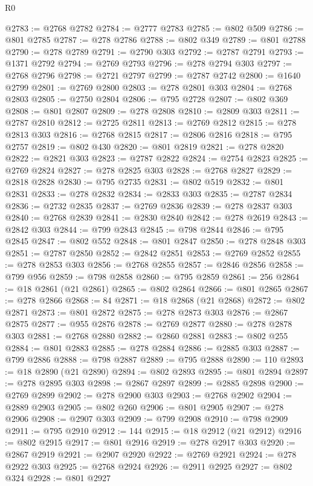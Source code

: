 \begin{lexlean}{R0}
\begin{coremodule}
@2783 := @2768 @2782
@2784 := @2777 @2783
@2785 := @802 @509
@2786 := @801 @2785
@2787 := @278 @2786
@2788 := @802 @349
@2789 := @801 @2788
@2790 := @278 @2789
@2791 := @2790 @303
@2792 := @2787 @2791
@2793 := @1371 @2792
@2794 := @2769 @2793
@2796 := @278 @2794 @303
@2797 := @2768 @2796
@2798 := @2721 @2797
@2799 := @2787 @2742
@2800 := @1640 @2799
@2801 := @2769 @2800
@2803 := @278 @2801 @303
@2804 := @2768 @2803
@2805 := @2750 @2804
@2806 := @795 @2728
@2807 := @802 @369
@2808 := @801 @2807
@2809 := @278 @2808
@2810 := @2809 @303
@2811 := @2787 @2810
@2812 := @2725 @2811
@2813 := @2769 @2812
@2815 := @278 @2813 @303
@2816 := @2768 @2815
@2817 := @2806 @2816
@2818 := @795 @2757
@2819 := @802 @430
@2820 := @801 @2819
@2821 := @278 @2820
@2822 := @2821 @303
@2823 := @2787 @2822
@2824 := @2754 @2823
@2825 := @2769 @2824
@2827 := @278 @2825 @303
@2828 := @2768 @2827
@2829 := @2818 @2828
@2830 := @795 @2735
@2831 := @802 @519
@2832 := @801 @2831
@2833 := @278 @2832
@2834 := @2833 @303
@2835 := @2787 @2834
@2836 := @2732 @2835
@2837 := @2769 @2836
@2839 := @278 @2837 @303
@2840 := @2768 @2839
@2841 := @2830 @2840
@2842 := @278 @2619
@2843 := @2842 @303
@2844 := @799 @2843
@2845 := @798 @2844
@2846 := @795 @2845
@2847 := @802 @552
@2848 := @801 @2847
@2850 := @278 @2848 @303
@2851 := @2787 @2850
@2852 := @2842 @2851
@2853 := @2769 @2852
@2855 := @278 @2853 @303
@2856 := @2768 @2855
@2857 := @2846 @2856
@2858 := @799 @956
@2859 := @798 @2858
@2860 := @795 @2859
@2861 := 256
@2864 := @18 @2861 (@21 @2861)
@2865 := @802 @2864
@2866 := @801 @2865
@2867 := @278 @2866
@2868 := 84
@2871 := @18 @2868 (@21 @2868)
@2872 := @802 @2871
@2873 := @801 @2872
@2875 := @278 @2873 @303
@2876 := @2867 @2875
@2877 := @955 @2876
@2878 := @2769 @2877
@2880 := @278 @2878 @303
@2881 := @2768 @2880
@2882 := @2860 @2881
@2883 := @802 @255
@2884 := @801 @2883
@2885 := @278 @2884
@2886 := @2885 @303
@2887 := @799 @2886
@2888 := @798 @2887
@2889 := @795 @2888
@2890 := 110
@2893 := @18 @2890 (@21 @2890)
@2894 := @802 @2893
@2895 := @801 @2894
@2897 := @278 @2895 @303
@2898 := @2867 @2897
@2899 := @2885 @2898
@2900 := @2769 @2899
@2902 := @278 @2900 @303
@2903 := @2768 @2902
@2904 := @2889 @2903
@2905 := @802 @260
@2906 := @801 @2905
@2907 := @278 @2906
@2908 := @2907 @303
@2909 := @799 @2908
@2910 := @798 @2909
@2911 := @795 @2910
@2912 := 144
@2915 := @18 @2912 (@21 @2912)
@2916 := @802 @2915
@2917 := @801 @2916
@2919 := @278 @2917 @303
@2920 := @2867 @2919
@2921 := @2907 @2920
@2922 := @2769 @2921
@2924 := @278 @2922 @303
@2925 := @2768 @2924
@2926 := @2911 @2925
@2927 := @802 @324
@2928 := @801 @2927

\end{coremodule}
\end{lexlean}
